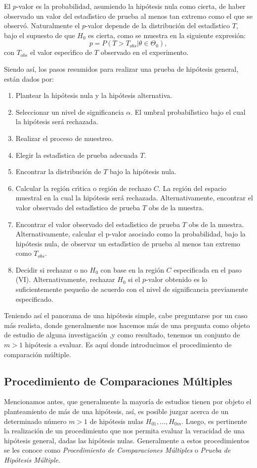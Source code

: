 \documentclass{article}
\theoremstyle{definition}
\begin{document}
El $p$-valor es la probabilidad, asumiendo la hipótesis nula como cierta, de haber observado un valor
del estadı́stico de prueba al menos tan extremo como el que se observó. Naturalmente el $p$-valor
depende de la distribución del estadı́stico $T$, bajo el supuesto de que $H_0$ es cierta, como se muestra en la siguiente expresión:
\begin{equation*}
	p=P(T>T_{obs}|\theta\in\Theta_0),
\end{equation*}
con $T_{obs}$ el valor especı́fico de $T$ observado en el experimento.

Siendo así, los pasos resumidos para realizar una prueba de hipótesis general, están dados por:
\begin{enumerate}[I]
	\item Plantear la hipótesis nula y la hipótesis alternativa.
	\item Seleccionar un nivel de significancia $\alpha$. El umbral probabilı́stico bajo el cual la hipótesis será rechazada.
	\item Realizar el proceso de muestreo.
	\item Elegir la estadı́stica de prueba adecuada $T$.
	\item Encontrar la distribución de $T$ bajo la hipótesis nula.
	\item Calcular la región crı́tica o región de rechazo $C$. La región del espacio muestral en la cual la
	hipótesis será rechazada. Alternativamente, encontrar el valor observado del estadı́stico de prueba $T$ obs de la muestra.
	\item Encontrar el valor observado del estadı́stico de prueba $T$ obs de la muestra. Alternativamente, calcular el p-valor asociado como la probabilidad, bajo la hipótesis nula, de observar un estadı́stico
	de prueba al menos tan extremo como $T_{obs}$.
	\item Decidir si rechazar o no $H_0$ con base en la región $C$ especificada en el paso (VI). Alternativamente, rechazar $H_0$ si el $p$-valor obtenido es lo suficientemente pequeño de acuerdo con el nivel de significancia previamente especificado.
\end{enumerate}
Teniendo así el panorama de una hipótesis simple, cabe preguntarse por un caso más realista, donde generalmente nos hacemos más de una pregunta como objeto de estudio de alguna investigación ,y como resultado, tenemos un conjunto de $m>1$ hipótesis a evaluar. Es aquí donde introducimos el procedimiento de comparación múltiple.

\subsection{Procedimiento de Comparaciones Múltiples}
Mencionamos antes, que generalmente la mayoría de estudios tienen por objeto el planteamiento de más de una hipótesis, así, es posible juzgar acerca de un determinado número $m>1$ de hipótesis nulas $H_{01},\dots,H_{0m}$. Luego, es pertinente la realización de un procedimiento que nos permita evaluar la veracidad de una hipótesis general, dadas las hipótesis nulas. Generalmente a estos procedimientos se les conoce como \textit{Procedimiento de Comparaciones Múltiples} o \textit{Prueba de Hipótesis Múltiple}.
\end{document}
